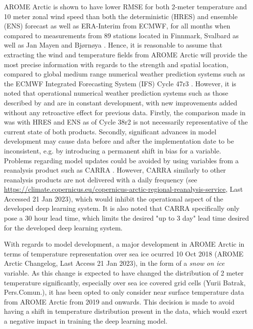 \documentclass[../main/thesis.tex]{subfiles}
\begin{document}
AROME Arctic is shown to have lower RMSE for both 2-meter temperature and 10 meter zonal wind speed than both the deterministic (HRES) and ensemble (ENS) forecast as well as ERA-Interim from ECMWF, for all months when compared to measurements from 89 stations located in Finnmark, Svalbard as well as Jan Mayen and Bjørnøya \citep{Mueller2017}. Hence, it is reasonable to assume that extracting the wind and temperature fields from AROME Arctic will provide the most precise information with regards to the strength and spatial location, compared to global medium range numerical weather prediction systems such as the ECMWF Integrated Forecasting System (IFS) Cycle 47r3 \citep{Haiden2022}. However, it is noted that operational numerical weather prediction systems such as those described by \citet{Mueller2017} and \citet{Haiden2022} are in constant development, with new improvements added without any retroactive effect for previous data. Firstly, the comparison made in \citet{Mueller2017} was with HRES and ENS as of Cycle 38r2 \cite{Bauer2013} is not necessarily representative of the current state of both products. Secondly, significant advances in model development may cause data before and after the implementation date to be inconsistent, e.g. by introducing a permanent shift in bias for a variable. Problems regarding model updates could be avoided by using variables from a reanalysis product such as CARRA \citep{Koeltzow2022}. However, CARRA similarly to other reanalysis products are not delivered with a daily frequency (see \url{https://climate.copernicus.eu/copernicus-arctic-regional-reanalysis-service}, Last Accessed 21 Jan 2023), which would inhibit the operational aspect of the developed deep learning system. It is also noted that CARRA specifically only pose a 30 hour lead time, which limits the desired "up to 3 day" lead time desired for the developed deep learning system.

With regards to model development, a major development in AROME Arctic in terms of temperature representation over sea ice ocurred 10 Oct 2018 (AROME Arctic Changelog, Last Access 21 Jan 2023), in the form of a \textit{snow on ice} variable. As this change is expected to have changed the distribution of 2 meter temperature significantly, especially over sea ice covered grid cells (Yurii Batrak, Pers.Comun.), it has been opted to only consider near surface temperature data from AROME Arctic from 2019 and onwards. This decision is made to avoid having a shift in temperature distribution present in the data, which would exert a negative impact in training the deep learning model.
\end{document}
